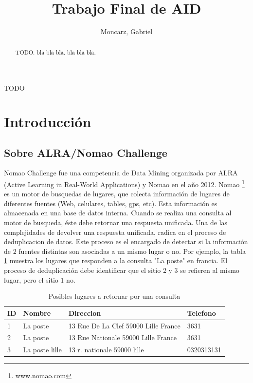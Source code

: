 \documentclass[journal]{IEEEtran}
\begin{document}
\title{Trabajo Final de AID}
\author{Moncarz, Gabriel}
\maketitle %


\begin{abstract}
TODO.
bla bla bla.
bla bla bla.
\end{abstract}

\begin{IEEEkeywords}
TODO
\end{IEEEkeywords}


\section{Introducción}

\subsection{Sobre ALRA/Nomao Challenge}
Nomao Challenge fue una competencia de Data Mining organizada por ALRA 
(Active Learning in Real-World Applications) y Nomao en el año 2012. Nomao 
\footnote{www.nomao.com} es un motor de busquedas de lugares, que colecta
información de lugares de diferentes fuentes (Web, celulares, tables, gps, 
etc). Esta información es almacenada en una base de datos interna. 
Cuando se realiza una consulta al motor de busqueda, éste debe retornar una
respuesta unificada. Una de las complejidades de devolver una
respuesta unificada, radica en el proceso de deduplicacion de datos. Este
proceso es el encargado de detectar si la información de 2 fuentes distintas
son asociadas a un mismo lugar o no. Por ejemplo, la tabla \ref{table:example1}
muestra los lugares que responden a la consulta "La poste" en francia. El
proceso de deduplicación debe identificar que el sitio 2 y 3 se refieren
al mismo lugar, pero el sitio 1 no.

\begin{table}[ht!]
\caption{Posibles lugares a retornar por una consulta}
\label{table:example1}
\centering
\begin{tabular}{l | l l l }
ID & Nombre & Direccion & Telefono  \\
\hline
1 & La poste & 13 Rue De La Clef 59000 Lille France & 3631 \\ 
2 & La poste & 13 Rue Nationale 59000 Lille France & 3631 \\
3 & La poste lille & 13 r. nationale 59000 lille & 0320313131 \\
\end{tabular}
\end{table}
\end{document}
